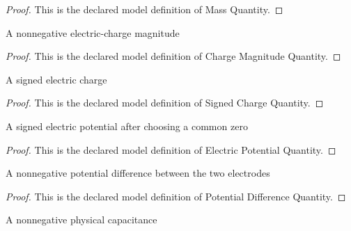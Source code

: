 \begin{proof}
  This is the declared model definition of Mass Quantity.
\end{proof}
\begin{definition}
  \label{def:physics:phyx-mini-0908:phyxminiproblems-problemphyxmini0908-chargemagnitudequantity}
  A nonnegative electric-charge magnitude
\end{definition}
\begin{proof}
  This is the declared model definition of Charge Magnitude Quantity.
\end{proof}
\begin{definition}
  \label{def:physics:phyx-mini-0908:phyxminiproblems-problemphyxmini0908-signedchargequantity}
  A signed electric charge
\end{definition}
\begin{proof}
  This is the declared model definition of Signed Charge Quantity.
\end{proof}
\begin{definition}
  \label{def:physics:phyx-mini-0908:phyxminiproblems-problemphyxmini0908-electricpotentialquantity}
  A signed electric potential after choosing a common zero
\end{definition}
\begin{proof}
  This is the declared model definition of Electric Potential Quantity.
\end{proof}
\begin{definition}
  \label{def:physics:phyx-mini-0908:phyxminiproblems-problemphyxmini0908-potentialdifferencequantity}
  A nonnegative potential difference between the two electrodes
\end{definition}
\begin{proof}
  This is the declared model definition of Potential Difference Quantity.
\end{proof}
\begin{definition}
  \label{def:physics:phyx-mini-0908:phyxminiproblems-problemphyxmini0908-capacitancequantity}
  A nonnegative physical capacitance
\end{definition}

